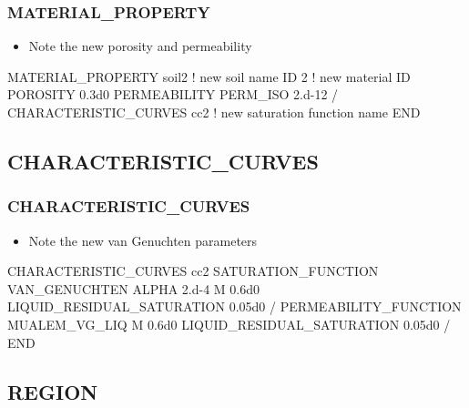 \documentclass{beamer}
\newcommand\bluecomment[1]{{{\color{blue} #1}}}
\newcommand\magentacomment[1]{{{\color{magenta} #1}}}
\begin{document}
\begin{frame}[fragile]\frametitle{MATERIAL\_PROPERTY}

\begin{itemize}
\item Note the new porosity and permeability
\end{itemize}

\begin{semiverbatim}
\magentacomment{
MATERIAL_PROPERTY soil2    \bluecomment{! new soil name}
  ID 2                     \bluecomment{! new material ID}
  POROSITY 0.3d0
  PERMEABILITY
    PERM_ISO 2.d-12
  /
  CHARACTERISTIC\_CURVES cc2  \bluecomment{! new saturation function name}
END}
\end{semiverbatim}

\end{frame}

\subsection{CHARACTERISTIC\_CURVES}

\begin{frame}[fragile]\frametitle{CHARACTERISTIC\_CURVES}

\begin{itemize}
\item Note the new van Genuchten parameters
\end{itemize}

\begin{semiverbatim}
\magentacomment{
CHARACTERISTIC_CURVES cc2
  SATURATION_FUNCTION VAN_GENUCHTEN
    ALPHA 2.d-4
    M 0.6d0
    LIQUID_RESIDUAL_SATURATION 0.05d0
  /
  PERMEABILITY_FUNCTION MUALEM_VG_LIQ
    M 0.6d0
    LIQUID_RESIDUAL_SATURATION 0.05d0
  /
END}

\end{semiverbatim}

\end{frame}

\subsection{REGION}
\end{document}

